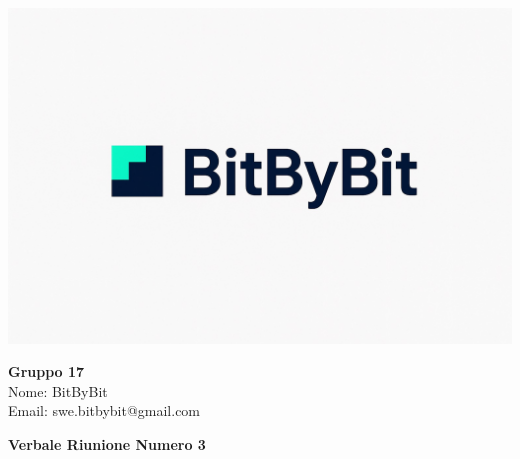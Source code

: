 \documentclass[a4paper,12pt]{article}
\begin{document}
\begin{center}
    \begin{minipage}{0.25\textwidth}
        \centering
        \includegraphics[width=\linewidth]{logo.png}
    \end{minipage}
    \hfill
    \begin{minipage}{0.7\textwidth}
        \raggedright
        {\LARGE \textbf{Gruppo 17}}\\[0.3cm]
        {\large
        Nome: BitByBit\\
        Email: swe.bitbybit@gmail.com
        }
    \end{minipage}
\end{center}

\vspace{1.5cm}

\begin{center}
    {\LARGE \textbf{Verbale Riunione Numero 3}}
\end{center}

\vspace*{\fill} %
\end{document}

